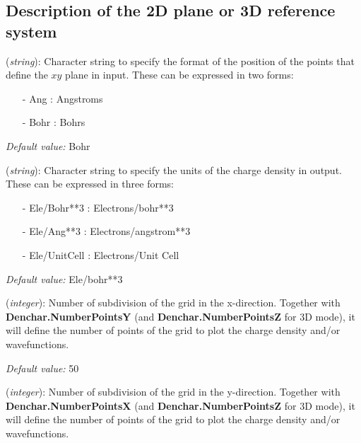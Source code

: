 \vspace{5pt}
\subsection{Description of the 2D plane or 3D reference system}

\begin{description}
\itemsep 10pt
\parsep 0pt

\item[{\bf Denchar.CoorUnits}] ({\it string}): 
Character string to specify the format of the position of the points that
define the $xy$ plane in input.
These can be expressed in two forms:

\begin{itemize}
\item[-] Ang        : Angstroms 
\item[-] Bohr       : Bohrs
\end{itemize}

{\it Default value:} Bohr

\item[{\bf Denchar.DensityUnits}] ({\it string}): 
Character string to specify the units of the charge density in output. 
These can be expressed in three forms:

\begin{itemize}
\item[-] Ele/Bohr**3      : Electrons/bohr**3
\item[-] Ele/Ang**3       : Electrons/angstrom**3
\item[-] Ele/UnitCell     : Electrons/Unit Cell 
\end{itemize}

{\it Default value:} Ele/bohr**3

\item[{\bf Denchar.NumberPointsX}] ({\it integer}):
 Number of subdivision of the grid in the x-direction. Together
 with {\bf Denchar.NumberPointsY} (and {\bf Denchar.NumberPointsZ}
 for 3D mode), 
 it will define the 
 number of points of the grid to plot the charge density
 and/or wavefunctions.

{\it Default value:} 50

\item[{\bf Denchar.NumberPointsY}] ({\it integer}):
 Number of subdivision of the grid in the y-direction. Together
 with {\bf Denchar.NumberPointsX} (and {\bf Denchar.NumberPointsZ}
 for 3D mode), 
 it will define the 
 number of points of the grid to plot the charge density
 and/or wavefunctions.


\end{description}
